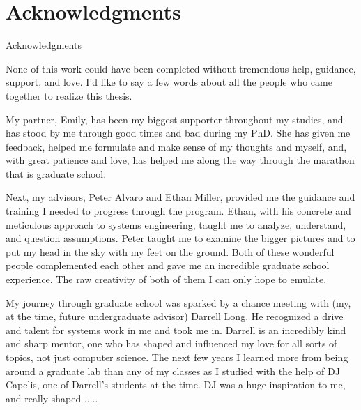 

\begingroup
\let\clearpage\relax
\let\cleardoublepage\relax
\let\cleardoublepage\relax
\chapter*{Acknowledgments}

Acknowledgments

None of this work could have been completed without tremendous help, guidance, support, and love. I'd like to say a few
words about all the people who came together to realize this thesis.

My partner, Emily, has been my biggest supporter throughout my studies, and has stood by me through good times and bad
during my PhD. She has given me feedback, helped me formulate and make sense of my thoughts and myself, and, with great
patience and love, has helped me along the way through the marathon that is graduate school.

Next, my advisors, Peter Alvaro and Ethan Miller, provided me the guidance and training I needed to progress through the
program. Ethan, with his concrete and meticulous approach to systems engineering, taught me to analyze, understand, and
question assumptions. Peter taught me to examine the bigger pictures and to put my head in the sky with my feet on the
ground. Both of these wonderful people complemented each other and gave me an incredible graduate school experience. The
raw creativity of both of them I can only hope to emulate.

My journey through graduate school was sparked by a chance meeting with (my, at the time, future undergraduate advisor)
Darrell Long. He recognized a drive and talent for systems work in me and took me in. Darrell is an incredibly kind and
sharp mentor, one who has shaped and influenced my love for all sorts of topics, not just computer science.
The next few years I learned more
from being around a graduate lab than any of my classes as I studied with the help of DJ Capelis, one of Darrell's
students at the time. DJ was a huge inspiration to me, and really shaped .....

